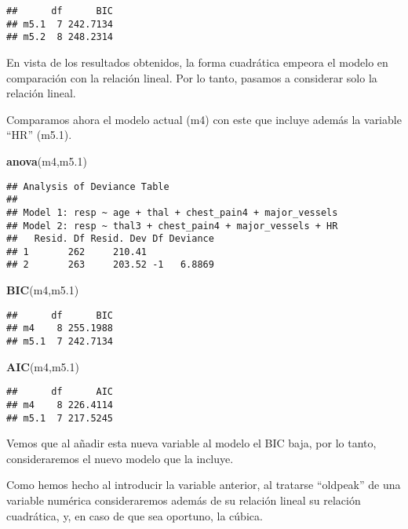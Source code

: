 \documentclass[]{article}
\newenvironment{Shaded}{\begin{snugshade}}{\end{snugshade}}
\newcommand{\KeywordTok}[1]{\textcolor[rgb]{0.13,0.29,0.53}{\textbf{#1}}}
\newcommand{\DecValTok}[1]{\textcolor[rgb]{0.00,0.00,0.81}{#1}}
\newcommand{\NormalTok}[1]{#1}
\begin{document}
\begin{verbatim}
##      df      BIC
## m5.1  7 242.7134
## m5.2  8 248.2314
\end{verbatim}

En vista de los resultados obtenidos, la forma cuadrática empeora el
modelo en comparación con la relación lineal. Por lo tanto, pasamos a
considerar solo la relación lineal.

Comparamos ahora el modelo actual (m4) con este que incluye además la
variable ``HR'' (m5.1).

\begin{Shaded}
\begin{Highlighting}[]
\KeywordTok{anova}\NormalTok{(m4,m5.}\DecValTok{1}\NormalTok{)}
\end{Highlighting}
\end{Shaded}

\begin{verbatim}
## Analysis of Deviance Table
## 
## Model 1: resp ~ age + thal + chest_pain4 + major_vessels
## Model 2: resp ~ thal3 + chest_pain4 + major_vessels + HR
##   Resid. Df Resid. Dev Df Deviance
## 1       262     210.41            
## 2       263     203.52 -1   6.8869
\end{verbatim}

\begin{Shaded}
\begin{Highlighting}[]
\KeywordTok{BIC}\NormalTok{(m4,m5.}\DecValTok{1}\NormalTok{)}
\end{Highlighting}
\end{Shaded}

\begin{verbatim}
##      df      BIC
## m4    8 255.1988
## m5.1  7 242.7134
\end{verbatim}

\begin{Shaded}
\begin{Highlighting}[]
\KeywordTok{AIC}\NormalTok{(m4,m5.}\DecValTok{1}\NormalTok{)}
\end{Highlighting}
\end{Shaded}

\begin{verbatim}
##      df      AIC
## m4    8 226.4114
## m5.1  7 217.5245
\end{verbatim}

Vemos que al añadir esta nueva variable al modelo el BIC baja, por lo
tanto, consideraremos el nuevo modelo que la incluye.

Como hemos hecho al introducir la variable anterior, al tratarse
``oldpeak'' de una variable numérica consideraremos además de su
relación lineal su relación cuadrática, y, en caso de que sea oportuno,
la cúbica.
\end{document}
